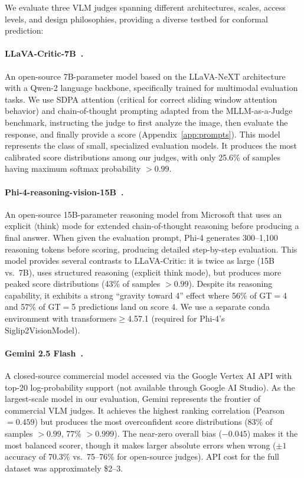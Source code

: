 \documentclass{article}
\begin{document}
We evaluate three VLM judges spanning different architectures, scales, access levels, and design philosophies, providing a diverse testbed for conformal prediction:

\paragraph{LLaVA-Critic-7B~\citep{xiong2024llavacritic}.} An open-source 7B-parameter model based on the LLaVA-NeXT architecture with a Qwen-2 language backbone, specifically trained for multimodal evaluation tasks. We use SDPA attention (critical for correct sliding window attention behavior) and chain-of-thought prompting adapted from the MLLM-as-a-Judge benchmark, instructing the judge to first analyze the image, then evaluate the response, and finally provide a score (Appendix~\ref{app:prompts}). This model represents the class of small, specialized evaluation models. It produces the most calibrated score distributions among our judges, with only 25.6\% of samples having maximum softmax probability $> 0.99$.

\paragraph{Phi-4-reasoning-vision-15B~\citep{abdin2025phi4reasoning}.} An open-source 15B-parameter reasoning model from Microsoft that uses an explicit $\langle\text{think}\rangle$ mode for extended chain-of-thought reasoning before producing a final answer. When given the evaluation prompt, Phi-4 generates 300--1,100 reasoning tokens before scoring, producing detailed step-by-step evaluation. This model provides several contrasts to LLaVA-Critic: it is twice as large (15B vs.\ 7B), uses structured reasoning (explicit think mode), but produces more peaked score distributions (43\% of samples $> 0.99$). Despite its reasoning capability, it exhibits a strong ``gravity toward 4'' effect where 56\% of GT$=$4 and 57\% of GT$=$5 predictions land on score 4. We use a separate conda environment with transformers$\geq$4.57.1 (required for Phi-4's Siglip2VisionModel).

\paragraph{Gemini 2.5 Flash~\citep{google2025gemini25}.} A closed-source commercial model accessed via the Google Vertex AI API with top-20 log-probability support (not available through Google AI Studio). As the largest-scale model in our evaluation, Gemini represents the frontier of commercial VLM judges. It achieves the highest ranking correlation (Pearson $= 0.459$) but produces the most overconfident score distributions (83\% of samples $> 0.99$, 77\% $> 0.999$). The near-zero overall bias ($-0.045$) makes it the most balanced scorer, though it makes larger absolute errors when wrong ($\pm 1$ accuracy of 70.3\% vs.\ 75--76\% for open-source judges). API cost for the full dataset was approximately \$2--3.
\end{document}
